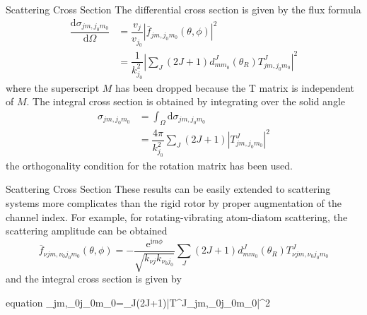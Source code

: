 \documentclass{beamer}
\begin{document}
	\begin{frame}{Scattering Cross Section}
		The differential cross section is given by the flux formula
		\begin{align}
			\dfrac{\mathrm{d}\sigma_{jm,j_0m_0}}{\mathrm{d}\Omega}&=\dfrac{v_j}{v_{j_0}}\left| \overline{f}_{jm,j_0m_0}(\theta,\phi)\right| ^2\nonumber\\
			&=\dfrac{1}{k^2_{j_0}}\left| \sum\limits_J(2J+1)d^J_{mm_0}(\theta_R)T^J_{jm,j_0m_0}\right| ^2
		\end{align}
		where the superscript $M$ has been dropped because the T matrix is independent of $M$. The integral cross section is obtained by integrating over the solid angle
		\begin{align}
			\sigma_{jm,j_0m_0}&=\int_\Omega\mathrm{d}\sigma_{jm,j_0m_0}\nonumber\\
			&=\dfrac{4\pi}{k^2_{j_0}}\sum\limits_J(2J+1)|T^J_{jm,j_0m_0}|^2
		\end{align}
		the orthogonality condition for the rotation matrix has been used.
	\end{frame}
	\begin{frame}{Scattering Cross Section}
		These results can be easily extended to scattering systems more complicates than the rigid rotor by proper augmentation of the channel index.
		For example, for rotating-vibrating atom-diatom scattering, the scattering amplitude can be obtained
		\begin{equation}
			\overline{f}_{\nu jm,\nu_0j_0m_0}(\theta,\phi)=-\dfrac{\mathrm{e}^{\mathrm{i}m\phi}}{\sqrt{k_{\nu j}k_{\nu_0j_0}}}\sum\limits_J(2J+1)d^J_{mm_0}(\theta_R)T^J_{\nu jm,\nu_0j_0m_0}
		\end{equation}
		and the integral cross section is given by
		\begin{empheq}[box=\fbox]{equation}
			\sigma_{\nu jm,\nu_0j_0m_0}=\sum\limits_J(2J+1)|T^J_{\nu jm,\nu_0j_0m_0}|^2
		\end{empheq}
	\end{frame}
\end{document}
